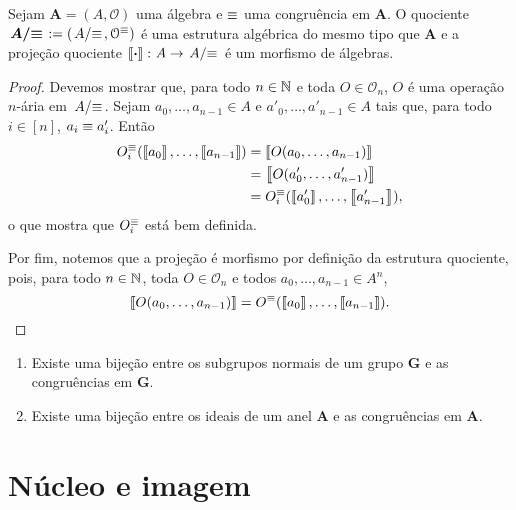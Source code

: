 \begin{proposition}
Sejam $\bm A = (A,\mathcal O)$ uma álgebra e $\equiv$ uma congruência em $\bm A$. O quociente $\bm{\quo{A}{\congr}} := (\quo{A}{\congr},\mathcal O^\congr)$ é uma estrutura algébrica do mesmo tipo que $\bm A$ e a projeção quociente $\cla{\var}\colon A \to \quo{A}{\congr}$ é um morfismo de álgebras.
\end{proposition}
\begin{proof}
Devemos mostrar que, para todo $n \in \mathbb{N}$ e toda $O \in \mathcal O_n$, $O$ é uma operação $n$-ária em $\quo{A}{\congr}$. Sejam $a_0,\ldots,a_{n-1} \in A$ e $a'_0,\ldots,a'_{n-1} \in A$ tais que, para todo $i \in [n]$, $a_i \equiv a'_i$. Então
	\begin{align*}
		O_i^\equiv(\left\llbracket{a_0}\right\rrbracket,\ldots,\left\llbracket{a_{n-1}}\right\rrbracket) &= \left\llbracket{O(a_0,\ldots,a_{n-1})}\right\rrbracket \\
			&= \left\llbracket{O(a'_0,\ldots,a'_{n-1})}\right\rrbracket \\
			&= O_i^\equiv(\left\llbracket{a'_0}\right\rrbracket,\ldots,\left\llbracket{a'_{n-1}}\right\rrbracket),
	\end{align*}
o que mostra que $O_i^\equiv$ está bem definida.

Por fim, notemos que a projeção é morfismo por definição da estrutura quociente, pois, para todo $n \in \mathbb{N}$, toda $O \in \mathcal O_n$ e todos $a_0,\ldots,a_{n-1} \in A^n$,
	\begin{equation*}
		\left\llbracket{O(a_0,\ldots,a_{n-1})}\right\rrbracket = O^\equiv(\left\llbracket{a_0}\right\rrbracket,\ldots,\left\llbracket{a_{n-1}}\right\rrbracket).						\qedhere
	\end{equation*}
\end{proof}

\begin{exercise}
	\begin{enumerate}
		\item Existe uma bijeção entre os subgrupos normais de um grupo $\bm G$ e as congruências em $\bm G$.
		\item Existe uma bijeção entre os ideais de um anel $\bm A$ e as congruências em $\bm A$.
	\end{enumerate}
\end{exercise}

\section{Núcleo e imagem}

